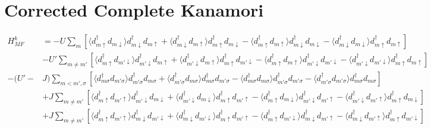 \documentclass[11pt]{article}
\begin{document}
\section{Corrected Complete Kanamori}
\begin{align}
    H^k_{MF} &= -U\sum_m \left[
        \langle d^\dagger_{m\uparrow}d_{m\downarrow}\rangle d^\dagger_{m\downarrow}d_{m\uparrow}
        + \langle d^\dagger_{m\downarrow}d_{m\uparrow}\rangle d^\dagger_{m\uparrow}d_{m\downarrow}
        - \langle d^\dagger_{m\uparrow}d_{m\uparrow}\rangle d^\dagger_{m\downarrow}d_{m\downarrow}
        - \langle d^\dagger_{m\downarrow}d_{m\downarrow}\rangle d^\dagger_{m\uparrow}d_{m\uparrow}
        \right]\\\nonumber
    &-U'\sum_{m\neq m'}\left[
        \langle d^\dagger_{m\uparrow} d_{m'\downarrow} \rangle d^\dagger_{m'\downarrow} d_{m\uparrow}
        + \langle d^\dagger_{m'\downarrow}d_{m\uparrow}\rangle d^\dagger_{m\uparrow}d_{m'\downarrow}
        - \langle d^\dagger_{m\uparrow}d_{m\uparrow}\rangle d^\dagger_{m'\downarrow} d_{m'\downarrow}
        - \langle d^\dagger_{m'\downarrow}d_{m'\downarrow}\rangle d^\dagger_{m\uparrow}d_{m\uparrow}
    \right] \\\nonumber
    -(U' -& J) \sum_{m < m', \sigma} \left[
        \langle d^\dagger_{m\sigma}d_{m'\sigma} \rangle d^\dagger_{m'\sigma}d_{m\sigma}
        + \langle d^\dagger_{m' \sigma}d_{m\sigma} \rangle d^\dagger_{m\sigma}d_{m'\sigma}
        - \langle d^\dagger_{m\sigma}d_{m\sigma}\rangle d^\dagger_{m'\sigma}d_{m'\sigma}
        - \langle d^\dagger_{m'\sigma}d_{m'\sigma}\rangle d^\dagger_{m\sigma}d_{m\sigma}
    \right]\\\nonumber
    &+ J\sum_{m\neq m'}\left[\langle d^\dagger_{m\uparrow} d_{m'\uparrow} \rangle d^\dagger_{m' \downarrow} d_{m\downarrow}
    + \langle d^\dagger_{m' \downarrow} d_{m\downarrow}\rangle d^\dagger_{m\uparrow}d_{m' \uparrow}
    - \langle d^\dagger_{m \uparrow} d_{m\downarrow}\rangle d^\dagger_{m'\downarrow}d_{m'\uparrow}
    - \langle d^\dagger_{m'\downarrow} d_{m'\uparrow} \rangle d^\dagger_{m\uparrow} d_{m \downarrow}\right] \\\nonumber
    &+ J\sum_{m\neq m'}\left[
        \langle d^\dagger_{m\uparrow} d_{m'\uparrow}\rangle d^\dagger_{m\downarrow} d_{m'\downarrow}
        +\langle d^\dagger_{m\downarrow} d_{m'\downarrow}\rangle d^\dagger_{m\uparrow}d_{m'\uparrow}
        - \langle d^\dagger_{m\uparrow} d_{m'\downarrow}\rangle d^\dagger_{m\downarrow}d_{m'\uparrow}
        - \langle d^\dagger_{m\downarrow} d_{m'\uparrow}\rangle d^\dagger_{m\uparrow} d_{m'\downarrow}
    \right]
\end{align}
\end{document}
